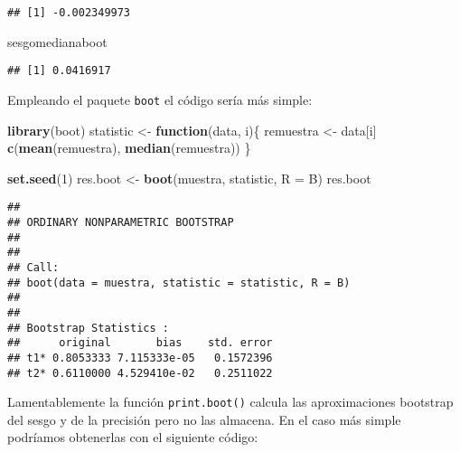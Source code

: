 \documentclass[
]{book}
\newenvironment{Shaded}{\begin{snugshade}}{\end{snugshade}}
\newcommand{\ControlFlowTok}[1]{\textcolor[rgb]{0.13,0.29,0.53}{\textbf{#1}}}
\newcommand{\DataTypeTok}[1]{\textcolor[rgb]{0.13,0.29,0.53}{#1}}
\newcommand{\DecValTok}[1]{\textcolor[rgb]{0.00,0.00,0.81}{#1}}
\newcommand{\KeywordTok}[1]{\textcolor[rgb]{0.13,0.29,0.53}{\textbf{#1}}}
\newcommand{\NormalTok}[1]{#1}
\newcommand{\OperatorTok}[1]{\textcolor[rgb]{0.81,0.36,0.00}{\textbf{#1}}}
\newcommand{\OtherTok}[1]{\textcolor[rgb]{0.56,0.35,0.01}{#1}}
\newcommand{\StringTok}[1]{\textcolor[rgb]{0.31,0.60,0.02}{#1}}
\theoremstyle{definition}
\theoremstyle{definition}
\theoremstyle{definition}
\theoremstyle{remark}
\begin{document}
\begin{verbatim}
## [1] -0.002349973
\end{verbatim}

\begin{Shaded}
\begin{Highlighting}[]
\NormalTok{sesgomedianaboot}
\end{Highlighting}
\end{Shaded}

\begin{verbatim}
## [1] 0.0416917
\end{verbatim}

Empleando el paquete \texttt{boot} el código sería más simple:

\begin{Shaded}
\begin{Highlighting}[]
\KeywordTok{library}\NormalTok{(boot)}
\NormalTok{statistic <-}\StringTok{ }\ControlFlowTok{function}\NormalTok{(data, i)\{}
\NormalTok{  remuestra <-}\StringTok{ }\NormalTok{data[i]}
  \KeywordTok{c}\NormalTok{(}\KeywordTok{mean}\NormalTok{(remuestra), }\KeywordTok{median}\NormalTok{(remuestra))}
\NormalTok{\}}

\KeywordTok{set.seed}\NormalTok{(}\DecValTok{1}\NormalTok{)}
\NormalTok{res.boot <-}\StringTok{ }\KeywordTok{boot}\NormalTok{(muestra, statistic, }\DataTypeTok{R =}\NormalTok{ B)}
\NormalTok{res.boot}
\end{Highlighting}
\end{Shaded}

\begin{verbatim}
## 
## ORDINARY NONPARAMETRIC BOOTSTRAP
## 
## 
## Call:
## boot(data = muestra, statistic = statistic, R = B)
## 
## 
## Bootstrap Statistics :
##      original       bias    std. error
## t1* 0.8053333 7.115333e-05   0.1572396
## t2* 0.6110000 4.529410e-02   0.2511022
\end{verbatim}

Lamentablemente la función \texttt{print.boot()} calcula las aproximaciones
bootstrap del sesgo y de la precisión pero no las almacena.
En el caso más simple podríamos obtenerlas con el siguiente código:

\begin{Shaded}
\end{Shaded}
\end{document}
